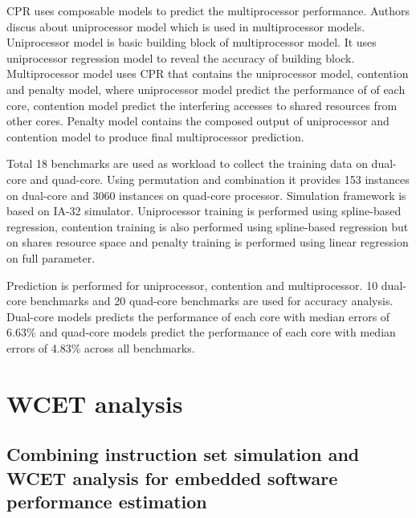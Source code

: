 \par CPR uses composable models to predict the multiprocessor performance. Authors discus about uniprocessor model which is used in multiprocessor models. Uniprocessor model is basic building block of multiprocessor model. It uses uniprocessor regression model to reveal the accuracy of building block. Multiprocessor model uses CPR that contains the uniprocessor model, contention and penalty model, where uniprocessor model predict the performance of of each core, contention model predict the interfering accesses to shared resources from other cores. Penalty model contains the composed output of uniprocessor and contention model to produce final multiprocessor prediction. 

\par Total 18 benchmarks are used as workload to collect the training data on dual-core and quad-core. Using permutation and combination it provides 153 instances on dual-core and 3060 instances on quad-core processor. Simulation framework is based on IA-32 simulator. Uniprocessor training is performed using spline-based regression, contention training is also performed  using spline-based regression but on shares resource space and penalty training is performed using linear regression on full parameter. 

\par Prediction is performed for uniprocessor, contention and multiprocessor. 10 dual-core benchmarks and 20 quad-core benchmarks are used  for accuracy analysis. Dual-core models predicts the performance of each core with median errors of 6.63\% and quad-core models predict the performance of each core with median errors of 4.83\% across all benchmarks.

\section{WCET analysis}
\subsection{Combining instruction set simulation and WCET analysis for embedded software performance estimation}

